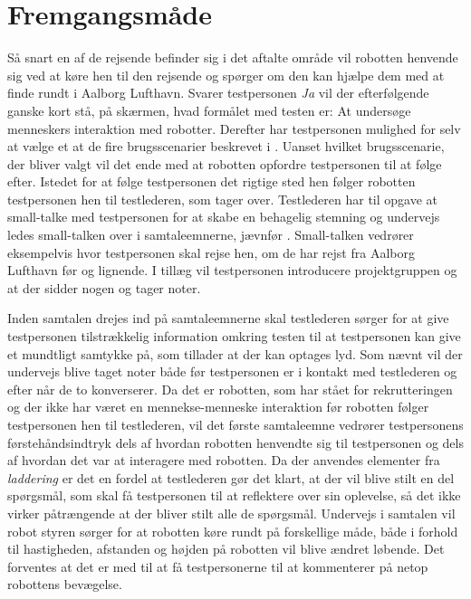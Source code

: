 \section{Fremgangsmåde}
\label{ParametreFremgangsmaade}
%
Så snart en af de rejsende befinder sig i det aftalte område vil robotten henvende sig ved at køre hen til den rejsende og spørger om den kan hjælpe dem med at finde rundt i Aalborg Lufthavn. Svarer testpersonen \textit{Ja} vil der efterfølgende ganske kort stå, på skærmen, hvad formålet med testen er: At undersøge menneskers interaktion med robotter. Derefter har testpersonen mulighed for selv at vælge et at de fire brugsscenarier beskrevet i . Uanset hvilket brugsscenarie, der bliver valgt vil det ende med at robotten opfordre testpersonen til at følge efter. Istedet for at følge testpersonen det rigtige sted hen følger robotten testpersonen hen til testlederen, som tager over. Testlederen har til opgave at small-talke med testpersonen for at skabe en behagelig stemning og undervejs ledes small-talken over i samtaleemnerne, jævnfør . Small-talken vedrører eksempelvis hvor testpersonen skal rejse hen, om de har rejst fra Aalborg Lufthavn før og lignende. I tillæg vil testpersonen introducere projektgruppen og at der sidder nogen og tager noter. 

Inden samtalen drejes ind på samtaleemnerne skal testlederen sørger for at give testpersonen tilstrækkelig information omkring testen til at testpersonen kan give et mundtligt samtykke på, som tillader at der kan optages lyd. Som nævnt vil der undervejs blive taget noter både før testpersonen er i kontakt med testlederen og efter når de to konverserer. \blankline
%
Da det er robotten, som har stået for rekrutteringen og der ikke har været en mennekse-menneske interaktion før robotten følger testpersonen hen til testlederen, vil det første samtaleemne vedrører testpersonens førstehåndsindtryk dels af hvordan robotten henvendte sig til testpersonen og dels af hvordan det var at interagere med robotten. Da der anvendes elementer fra \textit{laddering} er det en fordel at testlederen gør det klart, at der vil blive stilt en del spørgsmål, som skal få testpersonen til at reflektere over sin oplevelse, så det ikke virker påtrængende at der bliver stilt alle de spørgsmål. Undervejs i samtalen vil robot styren sørger for at robotten køre rundt på forskellige måde, både i forhold til hastigheden, afstanden og højden på robotten vil blive ændret løbende. Det forventes at det er med til at få testpersonerne til at kommenterer på netop robottens bevægelse. 

